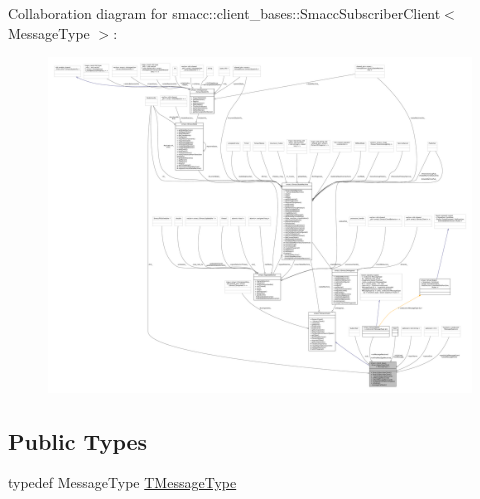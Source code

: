 Collaboration diagram for smacc\+:\+:client\+\_\+bases\+:\+:Smacc\+Subscriber\+Client$<$ Message\+Type $>$\+:
\nopagebreak
\begin{figure}[H]
\begin{center}
\leavevmode
\includegraphics[width=350pt]{classsmacc_1_1client__bases_1_1SmaccSubscriberClient__coll__graph}
\end{center}
\end{figure}
\subsection*{Public Types}
\begin{DoxyCompactItemize}
\item 
typedef Message\+Type \hyperlink{classsmacc_1_1client__bases_1_1SmaccSubscriberClient_a61d798bda71bf335d72e61928ca561b0}{T\+Message\+Type}
\end{DoxyCompactItemize}
